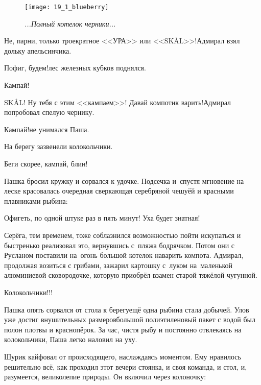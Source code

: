 \begin{wrapfigure}[11]{r}{0.45\textwidth}
	\centering
	\texttt{[image: 19\_1\_blueberry]}
	\caption{\small\textit{...Полный котелок черники...}}
\end{wrapfigure}


\diagdash Не, парни, только троекратное <<УРА>> или <<SKÅL>>!\mdash Адмирал взял дольку апельсинчика.


\diagdash Пофиг, будем!\mdash лес железных кубков поднялся.

\diagdash Кампай!

\diagdash SKÅL! Ну тебя с этим <<кампаем>>! Давай компотик варить!\mdash Адмирал попробовал спелую чернику.

\diagdash Кампай!\mdash не унимался Паша.

На берегу зазвенели колокольчики.

\diagdash Беги скорее, кампай, блин!

Пашка бросил кружку и сорвался к удочке. Подсечка и~спустя мгновение на леске красовалась очередная сверкающая серебряной чешуёй и красными плавниками рыбина:

\diagdash Офигеть, по одной штуке раз в пять минут! Уха будет знатная!

Серёга, тем временем, тоже соблазнился возможностью пойти искупаться и быстренько реализовал это, вернувшись с~пляжа бодрячком. Потом они с Русланом поставили на~огонь большой котелок наварить компота. Адмирал, продолжая возиться с грибами, зажарил картошку с~луком на~маленькой алюминиевой сковородочке, которую приобрёл взамен старой тяжёлой чугунной. 

\diagdash Колокольчики!!!

Пашка опять сорвался от стола к берегу\mdash ещё одна рыбина стала добычей. Улов уже достиг внушительных размеров\mdash большой полиэтиленовый пакет с водой был полон плотвы и краснопёрок. За час, чистя рыбу и постоянно отвлекаясь на колокольчики, Паша легко наловил на уху.

Шурик кайфовал от происходящего, наслаждаясь моментом. Ему нравилось решительно всё, как проходил этот вечер\mdash и стоянка, и своя команда, и стол, и, разумеется, великолепие природы. Он включил через колоночку:


